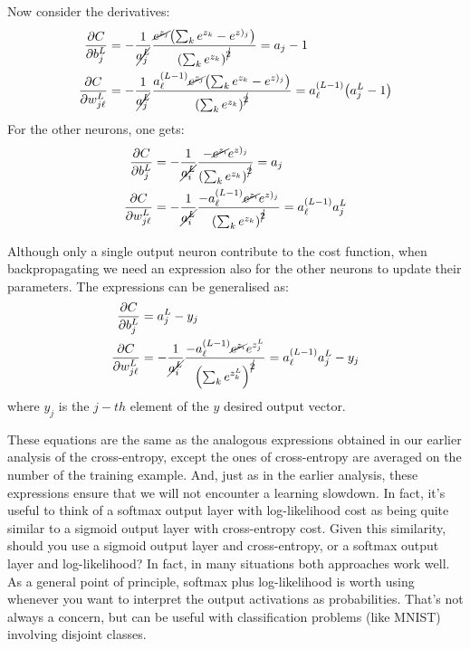 \documentclass[12pt, letterpaper]{article}
\theoremstyle{definition}
\DeclarePairedDelimiter\autobracket{(}{)}
\newcommand{\br}[1]{\autobracket*{#1}}
\begin{document}
Now consider the derivatives:
\begin{equation}
\begin{aligned}
\frac{\partial C}{\partial b_j^L} &= -\frac{1}{\cancel{a_j^L}}\frac{\cancel{e^{z_j}}\br{\sum_k e^{z_k}-e^{z)_j}}}{\br{\sum_k e^{z_k}}^{\cancel 2}} = a_j -1\\
\frac{\partial C}{\partial w_{j\ell}^L} &= -\frac{1}{\cancel{a_j^L}}\frac{a_\ell^{(L-1)}\cancel{e^{z_j}}\br{\sum_k e^{z_k}-e^{z)_j}}}{\br{\sum_k e^{z_k}}^{\cancel {2}}} = a_\ell^{(L-1)} \br{a_j^L -1}\\
\end{aligned}
\end{equation}
For the other neurons, one gets:
\begin{equation}
\begin{aligned}
\frac{\partial C}{\partial b_j^L} &= -\frac{1}{\cancel{a_i^L}}\frac{-\cancel{e^{z_i}} e^{z)_j}}{\br{\sum_k e^{z_k}}^{\cancel 2}} = a_j \\
\frac{\partial C}{\partial w_{j\ell}^L} &= -\frac{1}{\cancel{a_i^L}}\frac{-a_\ell^{(L-1)}\cancel{e^{z_i}}e^{z)_j}}{\br{\sum_k e^{z_k}}^{\cancel {2}}} = a_\ell^{(L-1)} a_j^L\\
\end{aligned}
\end{equation}

Although only a single output neuron contribute to the cost function, when backpropagating we need an expression also for the other neurons to update their parameters. The expressions can be generalised as:
\begin{equation}
\begin{aligned}
\frac{\partial C}{\partial b_j^L} &= a_j^L-y_j \\
\frac{\partial C}{\partial w_{j\ell}^L} &= -\frac{1}{\cancel{a_i^L}}\frac{-a_\ell^{(L-1)}\cancel{e^{z_i}}e^{z^L_j}}{\br{\sum_k e^{z^L_k}}^{\cancel {2}}} = a_\ell^{(L-1)} a_j^L-y_j\\
\end{aligned}
\end{equation}
where $y_j$ is the $j-th$ element of the $y$ desired output vector.

These equations are the same as the analogous expressions obtained in our earlier analysis of the cross-entropy, except the ones of cross-entropy are averaged on the number of the training example.  And, just as in the earlier analysis, these expressions ensure that we will not encounter a learning slowdown. In fact, it's useful to think of a softmax output layer with log-likelihood cost as being quite similar to a sigmoid output layer with cross-entropy cost. Given this similarity, should you use a sigmoid output layer and cross-entropy, or a softmax output layer and log-likelihood? In fact, in many situations both approaches work well. As a general point of principle, softmax plus log-likelihood is worth using whenever you want to interpret the output activations as probabilities. That's not always a concern, but can be useful with classification problems (like MNIST) involving disjoint classes.
\end{document}
